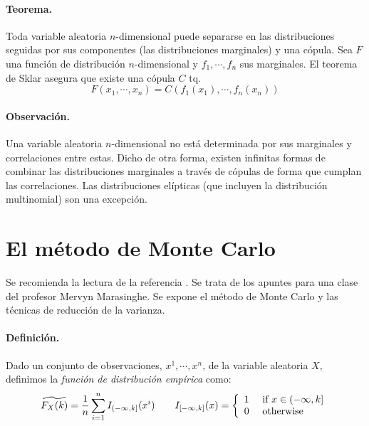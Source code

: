 \paragraph{Teorema.}  Toda variable aleatoria $n$-dimensional
puede separarse en las distribuciones seguidas por sus componentes (las distribuciones
marginales) y una c\'opula. Sea $F$ una funci\'on de distribuci\'on $n$-dimensional y
$f_1,\cdots, f_n$ sus marginales. El teorema de Sklar asegura que existe una 
c\'opula $C$ tq.
\begin{displaymath}
F(x_1, \cdots,x_n) = C(f_1(x_1), \cdots, f_n(x_n)) 
\end{displaymath}

\paragraph{Observaci\'on.} Una variable aleatoria $n$-dimensional no est\'a 
determinada por sus marginales y correlaciones entre estas. Dicho de otra
forma, existen infinitas formas de combinar las distribuciones marginales
 a trav\'es de c\'opulas de forma que cumplan las correlaciones. Las distribuciones 
el\'ipticas (que incluyen la distribuci\'on multinomial) son una excepci\'on. 


\section{El m\'etodo de Monte Carlo}

Se recomienda la lectura de la referencia \cite{mc:mervyn}. Se trata de los 
apuntes para una clase del profesor Mervyn Marasinghe. Se expone el m\'etodo 
de Monte Carlo y las t\'ecnicas de reducci\'on de la varianza.

\paragraph{Definici\'on.} Dado un conjunto de observaciones, $x^1, \cdots, x^n$,
de la variable aleatoria $X$, definimos la \emph{funci\'on de distribuci\'on emp\'irica}
 como:
\begin{displaymath}
\widetilde{F_X(k)} = \frac{1}{n} \sum_{i=1}^{n} I_{(-\infty,k]}(x^i) \qquad
I_{[-\infty,k]}(x) = \left\{
\begin{array}{ll}
1 & \textrm{ if } x \in (-\infty,k] \cr
0 & \textrm{ otherwise}
\end{array}
\right.
\end{displaymath}

